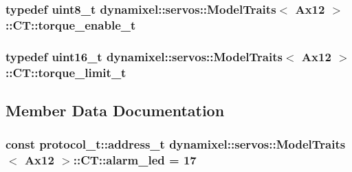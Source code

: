 \subsubsection[{\texorpdfstring{torque\+\_\+enable\+\_\+t}{torque_enable_t}}]{\setlength{\rightskip}{0pt plus 5cm}typedef uint8\+\_\+t {\bf dynamixel\+::servos\+::\+Model\+Traits}$<$ {\bf Ax12} $>$\+::{\bf C\+T\+::torque\+\_\+enable\+\_\+t}}\hypertarget{structdynamixel_1_1servos_1_1_model_traits_3_01_ax12_01_4_1_1_c_t_a3d99ff8f3e572df17184f79e37ffa714}{}\label{structdynamixel_1_1servos_1_1_model_traits_3_01_ax12_01_4_1_1_c_t_a3d99ff8f3e572df17184f79e37ffa714}
\subsubsection[{\texorpdfstring{torque\+\_\+limit\+\_\+t}{torque_limit_t}}]{\setlength{\rightskip}{0pt plus 5cm}typedef uint16\+\_\+t {\bf dynamixel\+::servos\+::\+Model\+Traits}$<$ {\bf Ax12} $>$\+::{\bf C\+T\+::torque\+\_\+limit\+\_\+t}}\hypertarget{structdynamixel_1_1servos_1_1_model_traits_3_01_ax12_01_4_1_1_c_t_acf60519762b645c78f05eb7cd19b943e}{}\label{structdynamixel_1_1servos_1_1_model_traits_3_01_ax12_01_4_1_1_c_t_acf60519762b645c78f05eb7cd19b943e}


\subsection{Member Data Documentation}
\subsubsection[{\texorpdfstring{alarm\+\_\+led}{alarm_led}}]{\setlength{\rightskip}{0pt plus 5cm}const {\bf protocol\+\_\+t\+::address\+\_\+t} {\bf dynamixel\+::servos\+::\+Model\+Traits}$<$ {\bf Ax12} $>$\+::C\+T\+::alarm\+\_\+led = 17\hspace{0.3cm}{\ttfamily [static]}}\hypertarget{structdynamixel_1_1servos_1_1_model_traits_3_01_ax12_01_4_1_1_c_t_a2f7f455eea0104a1d7f1c05864810a9a}{}\label{structdynamixel_1_1servos_1_1_model_traits_3_01_ax12_01_4_1_1_c_t_a2f7f455eea0104a1d7f1c05864810a9a}
